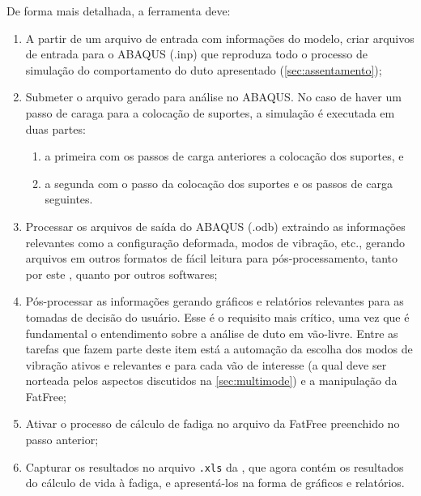 De forma mais detalhada, a ferramenta deve:



\begin{enumerate}[label= (\arabic*)]
    \item A partir de um arquivo de entrada com informações do modelo, criar arquivos de entrada para o ABAQUS (.inp) que reproduza todo o processo de simulação do comportamento do duto apresentado (\autoref{sec:assentamento});
    \item Submeter o arquivo gerado para análise no ABAQUS. No caso de haver um passo de caraga para a colocação de suportes, a simulação é executada em duas partes:
    \begin{enumerate}
        \item a primeira com os passos de carga anteriores a colocação dos suportes, e
        \item a segunda com o passo da colocação dos suportes e os passos de carga seguintes.
    \end{enumerate}
    \item Processar os arquivos de saída do ABAQUS (.odb) extraindo as informações relevantes como a configuração deformada, modos de vibração, etc., gerando arquivos em outros formatos de fácil leitura para pós-processamento, tanto por este \frame, quanto por outros softwares;
    \item Pós-processar as informações gerando gráficos e relatórios relevantes para as tomadas de decisão do usuário. Esse é o requisito mais crítico, uma vez que é fundamental o entendimento sobre a análise de duto em vão-livre. Entre as tarefas que fazem parte deste item está a automação da escolha dos modos de vibração ativos e relevantes e para cada vão de interesse (a qual deve ser norteada pelos aspectos discutidos na \autoref{sec:multimode}) e a manipulação da FatFree;
    \item Ativar o processo de cálculo de fadiga no arquivo da FatFree preenchido no passo anterior;
    \item Capturar os resultados no arquivo \texttt{.xls} da \fatfree, que agora contém os resultados do cálculo de vida à fadiga, e apresentá-los na forma de gráficos e relatórios.
\end{enumerate}



